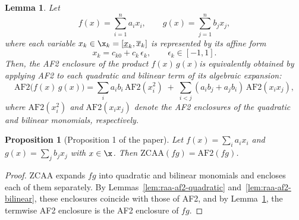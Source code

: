 \documentclass[10pt]{article}
\newtheorem{lem}{Lemma}
\newtheorem{propo}{Proposition}
\begin{document}
\begin{lem}
\label{lem:af2-linear-product}
Let
\[
f(x) = \sum_{i=1}^n a_i x_i,
\qquad
g(x) = \sum_{j=1}^n b_j x_j,
\]
where each variable \(x_k \in \x_k = [\underline{x}_k, \overline{x}_k]\) is represented by its affine form
\[
x_k = c_{k0} + c_k\,\epsilon_k, \qquad \epsilon_k \in [-1,1].
\]
Then, the AF2 enclosure of the product \(f(x)\,g(x)\)is equivalently obtained by applying AF2 to each quadratic and bilinear term of its algebraic expansion:
\[
\mathrm{AF2}\big(f(x)\,g(x)\big)
=
\sum_i a_i b_i\,\mathrm{AF2}(x_i^2)
\;+\;
\sum_{i<j}(a_i b_j + a_j b_i)\,\mathrm{AF2}(x_i x_j),
\]
where \(\mathrm{AF2}(x_i^2)\) and \(\mathrm{AF2}(x_i x_j)\) denote the AF2 enclosures of the quadratic and bilinear monomials, respectively.
\end{lem}

\begin{propo}[Proposition 1 of the paper]
Let $f(x)=\sum_i a_i x_i$ and $g(x)=\sum_j b_j x_j$ with $x\in\x$. Then $\mathrm{ZCAA}(f g)=\mathrm{AF2}(f g)$.
\end{propo}
\begin{proof}
ZCAA expands $fg$ into quadratic and bilinear monomials and encloses each of them separately. By Lemmas~\ref{lem:raa-af2-quadratic} and~\ref{lem:raa-af2-bilinear}, these enclosures coincide with those of AF2, and by Lemma~\ref{lem:af2-linear-product}, the termwise AF2 enclosure is the AF2 enclosure of $fg$.
\end{proof}
\end{document}
